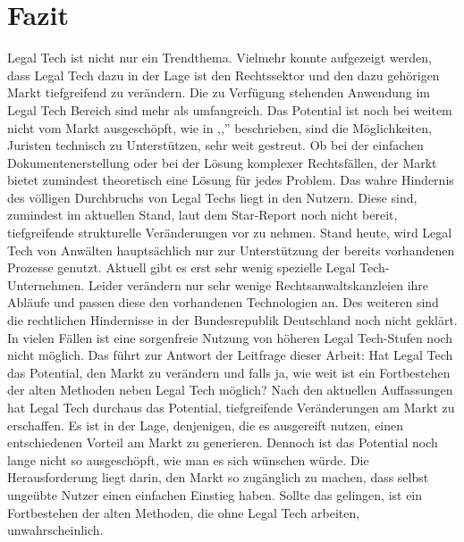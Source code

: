 \chapter{Fazit}

Legal Tech ist nicht nur ein Trendthema. Vielmehr konnte aufgezeigt werden, dass Legal Tech dazu in der Lage ist den Rechtssektor und den dazu gehörigen Markt tiefgreifend zu verändern.
Die zu Verfügung stehenden Anwendung im Legal Tech Bereich sind mehr als umfangreich.
Das Potential ist noch bei weitem nicht vom Markt ausgeschöpft, wie in ,,'' beschrieben, sind
die Möglichkeiten, Juristen technisch zu Unterstützen, sehr weit gestreut. Ob bei der einfachen Dokumentenerstellung oder bei der
Lösung komplexer Rechtsfällen, der Markt bietet zumindest theoretisch eine Lösung für jedes Problem. Das wahre Hindernis des völligen Durchbruchs von Legal Techs
liegt in den Nutzern. Diese sind, zumindest im aktuellen Stand, laut dem Star-Report noch nicht bereit,
tiefgreifende strukturelle Veränderungen vor zu nehmen. Stand heute, wird Legal Tech von Anwälten hauptsächlich nur zur Unterstützung der bereits
vorhandenen Prozesse genutzt. Aktuell gibt es erst sehr wenig spezielle Legal Tech-Unternehmen. Leider verändern nur sehr wenige Rechtsanwaltskanzleien ihre Abläufe und passen diese den vorhandenen Technologien an. Des weiteren sind die rechtlichen Hindernisse in der Bundesrepublik Deutschland noch nicht geklärt. In vielen Fällen ist eine sorgenfreie Nutzung von höheren Legal Tech-Stufen noch nicht möglich.
Das führt zur Antwort der Leitfrage dieser Arbeit:
Hat Legal Tech das Potential, den Markt zu verändern und falls ja, wie weit ist ein Fortbestehen der alten Methoden neben Legal Tech möglich?
Nach den aktuellen Auffassungen hat Legal Tech durchaus das Potential, tiefgreifende Veränderungen am Markt zu erschaffen. Es ist in der Lage,
denjenigen, die es ausgereift nutzen, einen entschiedenen Vorteil am Markt zu generieren. Dennoch ist das Potential noch lange nicht so ausgeschöpft,
wie man es sich wünschen würde. Die Herausforderung liegt darin, den Markt so zugänglich zu machen, dass selbst ungeübte Nutzer einen einfachen
Einstieg haben. Sollte das gelingen, ist ein Fortbestehen der alten Methoden, die ohne Legal Tech arbeiten, unwahrscheinlich.